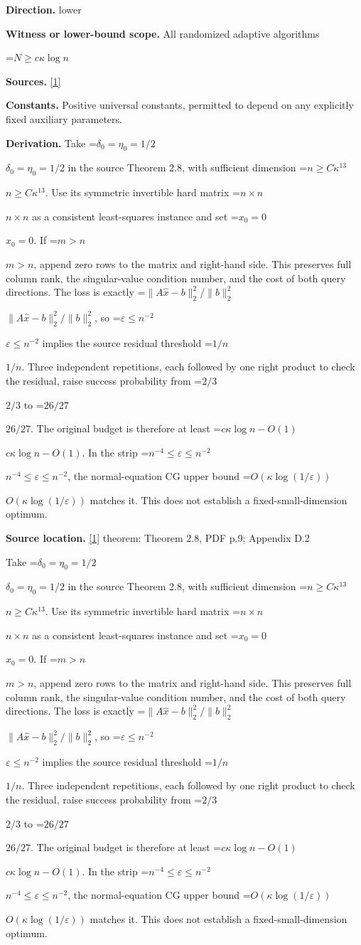 \documentclass[10pt,a4paper]{article}
\newcommand{\AtlasMath}[1]{\par\begingroup\centering\setbox0=\hbox{$\displaystyle #1$}\ifdim\wd0>1.4\linewidth\typeout{ATLAS WIDE FORMULA: \the\wd0}\fi\ifdim\wd0>\linewidth\resizebox{\linewidth}{!}{\box0}\else\box0\fi\par\endgroup}
\newcommand{\AtlasInlineMath}[1]{\begingroup\setbox0=\hbox{$#1$}\ifdim\wd0>.4\linewidth\endgroup\AtlasMath{#1}\else\endgroup$#1$\fi}
\begin{document}
\textbf{Direction.} lower

\textbf{Witness or lower-bound scope.} All randomized adaptive algorithms

\AtlasMath{N\ge c\kappa\log n}
\textbf{Sources.} \href{https://proceedings.mlr.press/v336/derezinski26a.html}{[1]}

\textbf{Constants.} Positive universal constants, permitted to depend on any explicitly fixed auxiliary parameters.

\textbf{Derivation.} Take \AtlasInlineMath{\delta_0=\eta_0=1/2} in the source Theorem 2.8, with sufficient dimension \AtlasInlineMath{n\ge C\kappa^{13}}. Use its symmetric invertible hard matrix \AtlasInlineMath{n\times n} as a consistent least-squares instance and set \AtlasInlineMath{x_0=0}. If \AtlasInlineMath{m>n}, append zero rows to the matrix and right-hand side. This preserves full column rank, the singular-value condition number, and the cost of both query directions. The loss is exactly \AtlasInlineMath{\|A\widehat x-b\|_2^2/\|b\|_2^2}, so \AtlasInlineMath{\varepsilon\le n^{-2}} implies the source residual threshold \AtlasInlineMath{1/n}. Three independent repetitions, each followed by one right product to check the residual, raise success probability from \AtlasInlineMath{2/3} to \AtlasInlineMath{26/27}. The original budget is therefore at least \AtlasInlineMath{c\kappa\log n-O(1)}. In the strip \AtlasInlineMath{n^{-4}\le\varepsilon\le n^{-2}}, the normal-equation CG upper bound \AtlasInlineMath{O(\kappa\log(1/\varepsilon))} matches it. This does not establish a fixed-small-dimension optimum.

\textbf{Source location.} \href{https://proceedings.mlr.press/v336/derezinski26a.html}{[1]} theorem: Theorem 2.8, PDF p.9; Appendix D.2

Take \AtlasInlineMath{\delta_0=\eta_0=1/2} in the source Theorem 2.8, with sufficient dimension \AtlasInlineMath{n\ge C\kappa^{13}}. Use its symmetric invertible hard matrix \AtlasInlineMath{n\times n} as a consistent least-squares instance and set \AtlasInlineMath{x_0=0}. If \AtlasInlineMath{m>n}, append zero rows to the matrix and right-hand side. This preserves full column rank, the singular-value condition number, and the cost of both query directions. The loss is exactly \AtlasInlineMath{\|A\widehat x-b\|_2^2/\|b\|_2^2}, so \AtlasInlineMath{\varepsilon\le n^{-2}} implies the source residual threshold \AtlasInlineMath{1/n}. Three independent repetitions, each followed by one right product to check the residual, raise success probability from \AtlasInlineMath{2/3} to \AtlasInlineMath{26/27}. The original budget is therefore at least \AtlasInlineMath{c\kappa\log n-O(1)}. In the strip \AtlasInlineMath{n^{-4}\le\varepsilon\le n^{-2}}, the normal-equation CG upper bound \AtlasInlineMath{O(\kappa\log(1/\varepsilon))} matches it. This does not establish a fixed-small-dimension optimum.
\end{document}
